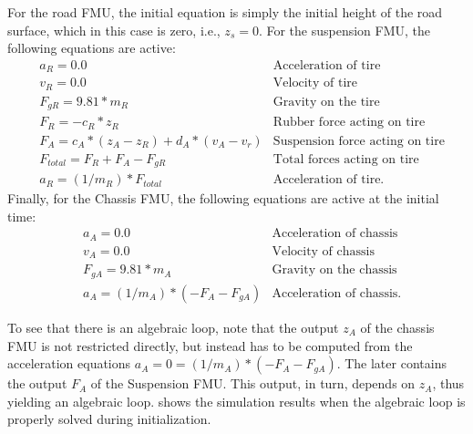 For the road FMU, the initial equation is simply the initial height of the road surface, which in this case is zero, i.e., $z_s=0$.
For the suspension FMU, the following equations are active:
\begin{align}
& a_R = 0.0 & \text{Acceleration of tire} \\
& v_R = 0.0 & \text{Velocity of tire} \\
& F_{gR} = 9.81 * m_R  & \text{Gravity on the tire} \\
& F_R = - c_R * z_R  & \text{Rubber force acting on tire} \\
& F_A = c_A * (z_A - z_R) + d_A * (v_A - v_r)  & \text{Suspension force acting on tire} \\
& F_{\mathit{total}} = F_R + F_A - F_{gR} & \text{Total forces acting on tire} \\
& a_R = (1/m_R) * F_{\mathit{total}}  & \text{Acceleration of tire}.
\end{align}
Finally, for the Chassis FMU, the following equations are active at the initial time:
\begin{align}
& a_A = 0.0 & \text{Acceleration of chassis} \\
& v_A = 0.0 & \text{Velocity of chassis} \\
& F_{gA} = 9.81 * m_A  & \text{Gravity on the chassis} \\
& a_A = (1/m_A) * (- F_A - F_{gA})  & \text{Acceleration of chassis}.
\end{align}

To see that there is an algebraic loop, note that the output $z_A$ of the chassis FMU is not restricted directly, but instead has to be computed from the acceleration equations $a_A = 0 = (1/m_A) * (- F_A - F_{gA})$.
The later contains the output $F_A$ of the Suspension FMU.
This output, in turn, depends on $z_A$, thus yielding an algebraic loop.
 shows the simulation results when the algebraic loop is properly solved during initialization.

